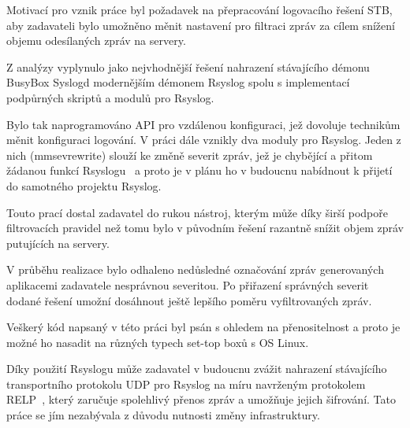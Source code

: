 \documentclass[thesis=B,czech]{FITthesis}[2012/06/26]
\begin{document}
\begin{conclusion}
Motivací pro vznik práce byl požadavek na přepracování logovacího řešení STB, aby zadavateli bylo umožněno měnit nastavení pro filtraci zpráv za cílem snížení objemu odesílaných zpráv na servery.

Z analýzy vyplynulo jako nejvhodnější řešení nahrazení stávajícího démonu BusyBox Syslogd modernějším démonem Rsyslog spolu s implementací podpůrných skriptů a modulů pro Rsyslog.
 
Bylo tak naprogramováno API pro vzdálenou konfiguraci, jež dovoluje technikům měnit konfiguraci logování. V práci dále vznikly dva moduly pro Rsyslog. Jeden z nich (mmsevrewrite) slouží ke změně severit zpráv, jež je chybějící a přitom žádanou funkcí Rsyslogu~\cite{rsysMailingList} a proto je v plánu ho v budoucnu nabídnout k přijetí do samotného projektu Rsyslog.

Touto prací dostal zadavatel do rukou nástroj, kterým může díky širší podpoře filtrovacích pravidel než tomu bylo v původním řešení razantně snížit objem zpráv putujících na servery.

V průběhu realizace bylo odhaleno nedůsledné označování zpráv generovaných aplikacemi zadavatele nesprávnou severitou. Po přiřazení správných severit dodané řešení umožní dosáhnout ještě lepšího poměru vyfiltrovaných zpráv.

Veškerý kód napsaný v této práci byl psán s ohledem na přenositelnost a proto je možné ho nasadit na různých typech set-top boxů s OS Linux.

Díky použití Rsyslogu může zadavatel v budoucnu zvážit nahrazení stávajícího  transportního protokolu UDP pro Rsyslog na míru navrženým protokolem RELP~\cite{RsyslogRELP}, který zaručuje spolehlivý přenos zpráv a umožňuje jejich šifrování. Tato práce se jím nezabývala z důvodu nutnosti změny infrastruktury.

\end{conclusion}




\appendix
\end{document}
